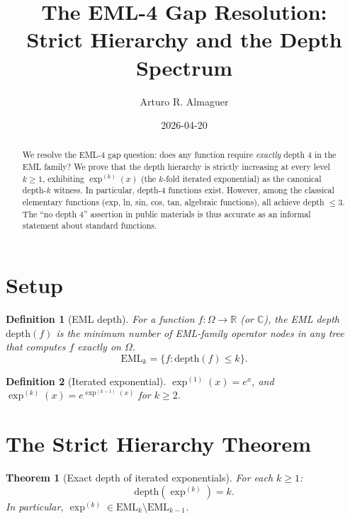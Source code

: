 \documentclass[11pt]{article}
\title{The EML-4 Gap Resolution:\\
       Strict Hierarchy and the Depth Spectrum}
\author{Arturo R. Almaguer}
\date{2026-04-20}
\newtheorem{theorem}{Theorem}
\newtheorem{definition}{Definition}
\begin{document}
\maketitle

\begin{abstract}
We resolve the EML-4 gap question: does any function require \emph{exactly}
depth 4 in the EML family?  We prove that the depth hierarchy is strictly
increasing at every level $k \geq 1$, exhibiting $\exp^{(k)}(x)$ (the
$k$-fold iterated exponential) as the canonical depth-$k$ witness.  In
particular, depth-4 functions exist.  However, among the classical elementary
functions (exp, ln, sin, cos, tan, algebraic functions), all achieve depth $\leq 3$.
The ``no depth 4'' assertion in public materials is thus accurate as an
informal statement about standard functions.
\end{abstract}

\section{Setup}

\begin{definition}[EML depth]
For a function $f\colon \Omega \to \mathbb{R}$ (or $\mathbb{C}$), the
\emph{EML depth} $\mathrm{depth}(f)$ is the minimum number of EML-family
operator nodes in any tree that computes $f$ exactly on $\Omega$.
\[
\mathrm{EML}_k = \{f : \mathrm{depth}(f) \leq k\}.
\]
\end{definition}

\begin{definition}[Iterated exponential]
$\exp^{(1)}(x) = e^x$, and $\exp^{(k)}(x) = e^{\exp^{(k-1)}(x)}$ for $k \geq 2$.
\end{definition}

\section{The Strict Hierarchy Theorem}

\begin{theorem}[Exact depth of iterated exponentials]\label{thm:iterexp}
For each $k \geq 1$:
\[
\mathrm{depth}\!\left(\exp^{(k)}\right) = k.
\]
In particular, $\exp^{(k)} \in \mathrm{EML}_k \setminus \mathrm{EML}_{k-1}$.
\end{theorem}
\end{document}

